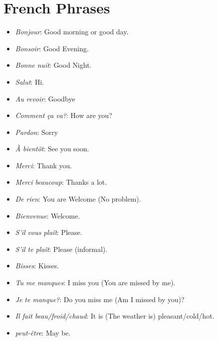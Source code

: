 \section{French Phrases}

\begin{itemize}

\item{\emph{Bonjour}: Good morning or good day.}

\item{\emph{Bonsoir}: Good Evening.}

\item{\emph{Bonne nuit}: Good Night.}

\item{\emph{Salut}: Hi.}

\item{\emph{Au revoir}: Goodbye}

\item{\emph{Comment \c{c}a va?}: How are you?}

\item{\emph{Pardon}: Sorry}

\item{\emph{\`{A} bient\^{o}t}: See you soon.}

\item{\emph{Merci}: Thank you.}

\item{\emph{Merci beaucoup}: Thanks a lot.}

\item{\emph{De rien}: You are Welcome (No problem).}

\item{\emph{Bienvenue}: Welcome.}

\item{\emph{S'il vous pla\^it}: Please.}

\item{\emph{S'il te pla\^it}: Please (informal).}

\item{\emph{Bisses}: Kisses.}

\item{\emph{Tu me manques}: I miss you (You are missed by me).}

\item{\emph{Je te manque?}: Do you miss me (Am I missed by you)?}

\item{\emph{Il fait beau/froid/chaud}: It is (The weather is)
pleasant/cold/hot.}

\item{\emph{peut-\^etre}: May be.}


\end{itemize}
